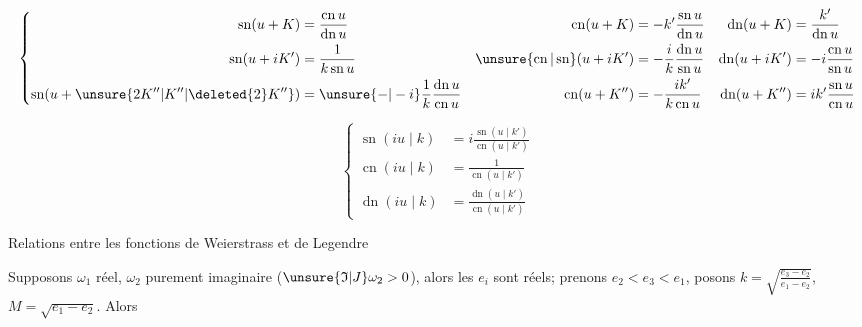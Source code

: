 \[
\left\{\begin{aligned}
\operatorname{sn}(u+K)&=\frac{\operatorname{cn} u}{\operatorname{dn} u}&\operatorname{cn}(u+K)&=-k'\frac{\operatorname{sn} u}{\operatorname{dn} u}&\operatorname{dn}(u+K)&=\frac{k'}{\operatorname{dn} u}\\
\operatorname{sn}(u+iK')&=\frac1{k\operatorname{sn} u}&\unsure{\operatorname{cn}|\operatorname{sn}}(u+iK')&=-\frac ik\frac{\operatorname{dn} u}{\operatorname{sn} u}&\operatorname{dn}(u+iK')&=-i\frac{\operatorname{cn} u}{\operatorname{sn} u}\\
\operatorname{sn}(u+\unsure{2K''|K''|\deleted{2}K''})&=\unsure{-|-i}\frac1k\frac{\operatorname{dn} u}{\operatorname{cn} u}&\operatorname{cn}(u+K'')&=-\frac{ik'}{k\operatorname{cn} u}&\operatorname{dn}(u+K'')&=ik'\frac{\operatorname{sn} u}{\operatorname{cn} u}
\end{aligned}\right.
\]

\[
\left\{\begin{aligned}
\operatorname{sn}(iu\mid k)&=i\frac{\operatorname{sn}(u\mid k')}{\operatorname{cn}(u\mid k')}\\
\operatorname{cn}(iu\mid k)&=\frac1{\operatorname{cn}(u\mid k')}\\
\operatorname{dn}(iu\mid k)&=\frac{\operatorname{dn}(u\mid k')}{\operatorname{cn}(u\mid k')}
\end{aligned}\right.
\]


\begin{center}Relations entre les fonctions de Weierstrass et de Legendre\end{center}

Supposons $\omega_1$ réel, $\omega_2$ purement imaginaire ($\unsure{\mathfrak I|J}\omega_2>0$), alors les $e_i$ sont réels; prenons $e_2<e_3<e_1$, posons $k=\sqrt{\frac{e_3-e_2}{e_1-e_2}}$, $M=\sqrt{e_1-e_2}$. Alors

